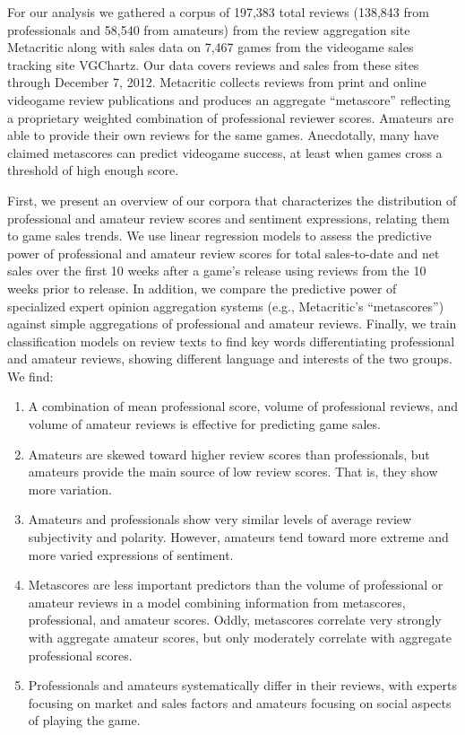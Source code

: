 \documentclass[letterpaper]{article}
\begin{document}
For our analysis we gathered a corpus of 197,383 total reviews (138,843 from professionals and 58,540 from amateurs) from the review aggregation site Metacritic along with sales data on 7,467 games from the videogame sales tracking site VGChartz. Our data covers reviews and sales from these sites through December 7, 2012. Metacritic collects reviews from print and online videogame review publications and produces an aggregate ``metascore'' reflecting a proprietary weighted combination of professional reviewer scores. Amateurs are able to provide their own reviews for the same games. Anecdotally, many have claimed metascores can predict videogame success, at least when games cross a threshold of high enough score. 

First, we present an overview of our corpora that characterizes the distribution of professional and amateur review scores and sentiment expressions, relating them to game sales trends. We use linear regression models to assess the predictive power of professional and amateur review scores for total sales-to-date and net sales over the first 10 weeks after a game's release using reviews from the 10 weeks prior to release. In addition, we compare the predictive power of specialized expert opinion aggregation systems (e.g., Metacritic's ``metascores'') against simple aggregations of professional and amateur reviews. Finally, we train classification models on review texts to find key words differentiating professional and amateur reviews, showing different language and interests of the two groups. We find:
\begin{enumerate}
\item A combination of mean professional score, volume of professional reviews, and volume of amateur reviews is effective for predicting game sales.
\item Amateurs are skewed toward higher review scores than professionals, but amateurs provide the main source of low review scores. That is, they show more variation.
\item Amateurs and professionals show very similar levels of average review subjectivity and polarity. However, amateurs tend toward more extreme and more varied expressions of sentiment.
\item Metascores are less important predictors than the volume of professional or amateur reviews in a model combining information from metascores, professional, and amateur scores. Oddly, metascores correlate very strongly with aggregate amateur scores, but only moderately correlate with aggregate professional scores.
\item Professionals and amateurs systematically differ in their reviews, with experts focusing on market and sales factors and amateurs focusing on social aspects of playing the game.
\end{enumerate}
\end{document}
